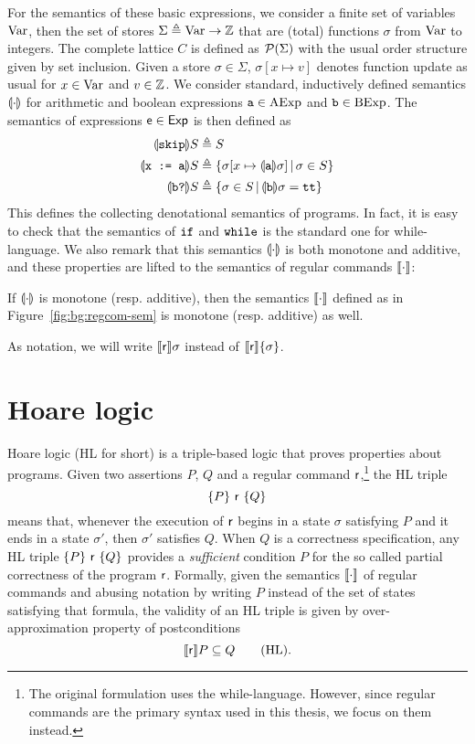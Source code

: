 For the semantics of these basic expressions, we consider a finite set of variables $\text{Var}$, then the set of stores $\Sigma \triangleq \text{Var} \rightarrow \mathbb{Z}$ that are (total) functions $\sigma$ from $\text{Var}$ to integers. The complete lattice $C$ is defined as $\mathcal{P}(\Sigma)$ with the usual order structure given by set inclusion. Given a store $\sigma \in \Sigma$, $\sigma[ x \mapsto v ]$ denotes function update as usual for $x \in \text{Var}$ and $v \in \mathbb{Z}$. We consider standard, inductively defined semantics $\llparenthesis\cdot\rrparenthesis$ for arithmetic and boolean expressions $\texttt{a} \in \text{AExp}$ and $\texttt{b} \in \text{BExp}$. The semantics of expressions $\mathsf{e} \in \mathsf{Exp}$ is then defined as
\begin{align*}
	\llparenthesis\texttt{skip}\rrparenthesis S   & \triangleq S                                                                                         \\
	\llparenthesis\texttt{x := a}\rrparenthesis S & \triangleq \left\lbrace \sigma[x \mapsto \llparenthesis\texttt{a}\rrparenthesis \sigma] \,\vert\, \sigma \in S \right\rbrace \\
	\llparenthesis\texttt{b?}\rrparenthesis S     & \triangleq \left\lbrace \sigma \in S \,\vert\, \llparenthesis\texttt{b}\rrparenthesis \sigma = \texttt{tt} \right\rbrace
\end{align*}
This defines the collecting denotational semantics of programs. In fact, it is easy to check that the semantics of $\texttt{if}$ and $\texttt{while}$ is the standard one for while-language. We also remark that this semantics $\llparenthesis\cdot\rrparenthesis$ is both monotone and additive, and these properties are lifted to the semantics of regular commands $\llbracket\cdot\rrbracket$:
\begin{prop}\label{prop:bg:fwsem-monotone}
	If $\llparenthesis\cdot\rrparenthesis$ is monotone (resp. additive), then the semantics $\llbracket\cdot\rrbracket$ defined as in Figure~\ref{fig:bg:regcom-sem} is monotone (resp. additive) as well.
\end{prop}

As notation, we will write $\llbracket\mathsf{r}\rrbracket\sigma$ instead of $\llbracket\mathsf{r}\rrbracket\{\sigma\}$.

\section{Hoare logic}\label{sec:bg:hl}
Hoare logic (HL for short) \cite{Hoare69} is a triple-based logic that proves properties about programs. Given two assertions $P$, $Q$ and a regular command $\mathsf{r}$,\footnote{The original formulation uses the while-language. However, since regular commands are the primary syntax used in this thesis, we focus on them instead.} the HL triple
\[
\{P\}~\mathsf{r}~\{Q\}
\]
means that, whenever the execution of $\mathsf{r}$ begins in a state $\sigma$ satisfying $P$ and it ends in a state $\sigma'$, then $\sigma'$ satisfies $Q$.
When $Q$ is a correctness specification, any HL triple $\{P\}~\mathsf{r}~\{Q\}$ provides a \emph{sufficient} condition $P$ for the so called partial correctness of the program $\mathsf{r}$.
Formally, given the semantics $\llbracket\cdot\rrbracket$ of regular commands and abusing notation by writing $P$ instead of the set of states satisfying that formula, the validity of an HL triple is given by over-approximation property of postconditions
\[
\llbracket\mathsf{r}\rrbracket P \subseteq Q \tag{HL}\label{eq:bg:hl-validity}.
\]

